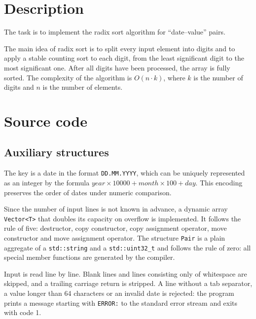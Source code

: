 \section{Description}

The task is to implement the radix sort algorithm for \enquote{date--value} pairs.

The main idea of radix sort is to split every input element into digits and to apply
a stable counting sort to each digit, from the least significant digit to the most
significant one. After all digits have been processed, the array is fully sorted.
The complexity of the algorithm is $O(n \cdot k)$, where $k$ is the number of digits
and $n$ is the number of elements.

\pagebreak

\section{Source code}

\subsection{Auxiliary structures}

The key is a date in the format \texttt{DD.MM.YYYY}, which can be uniquely represented
as an integer by the formula $year \times 10000 + month \times 100 + day$. This encoding
preserves the order of dates under numeric comparison.

Since the number of input lines is not known in advance, a dynamic array
\texttt{Vector<T>} that doubles its capacity on overflow is implemented. It follows
the rule of five: destructor, copy constructor, copy assignment operator,
move constructor and move assignment operator. The structure \texttt{Pair} is a plain
aggregate of a \texttt{std::string} and a \texttt{std::uint32\_t} and follows the rule of zero:
all special member functions are generated by the compiler.

Input is read line by line. Blank lines and lines consisting only of whitespace are skipped,
and a trailing carriage return is stripped. A line without a tab separator, a value longer
than 64 characters or an invalid date is rejected: the program prints a message starting with
\texttt{ERROR:} to the standard error stream and exits with code 1.

